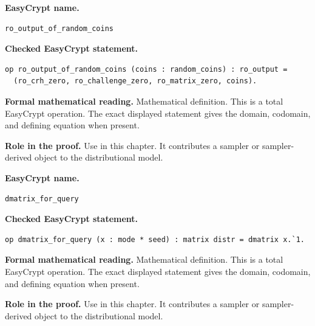 \begin{formaldefinition}
\noindent\textbf{EasyCrypt name.}
\begin{lstlisting}[language=EasyCrypt,basicstyle=\ttfamily\scriptsize]
ro_output_of_random_coins
\end{lstlisting}
\noindent\textbf{Checked EasyCrypt statement.}
\begin{lstlisting}[language=EasyCrypt,basicstyle=\ttfamily\scriptsize]
op ro_output_of_random_coins (coins : random_coins) : ro_output =
  (ro_crh_zero, ro_challenge_zero, ro_matrix_zero, coins).
\end{lstlisting}
\noindent\textbf{Formal mathematical reading.}
Mathematical definition. This is a total EasyCrypt operation.  The exact displayed statement gives the domain, codomain, and defining equation when present.

\noindent\textbf{Role in the proof.}
Use in this chapter. It contributes a sampler or sampler-derived object to the distributional model.

\end{formaldefinition}

\begin{formaldefinition}
\noindent\textbf{EasyCrypt name.}
\begin{lstlisting}[language=EasyCrypt,basicstyle=\ttfamily\scriptsize]
dmatrix_for_query
\end{lstlisting}
\noindent\textbf{Checked EasyCrypt statement.}
\begin{lstlisting}[language=EasyCrypt,basicstyle=\ttfamily\scriptsize]
op dmatrix_for_query (x : mode * seed) : matrix distr = dmatrix x.`1.
\end{lstlisting}
\noindent\textbf{Formal mathematical reading.}
Mathematical definition. This is a total EasyCrypt operation.  The exact displayed statement gives the domain, codomain, and defining equation when present.

\noindent\textbf{Role in the proof.}
Use in this chapter. It contributes a sampler or sampler-derived object to the distributional model.

\end{formaldefinition}

